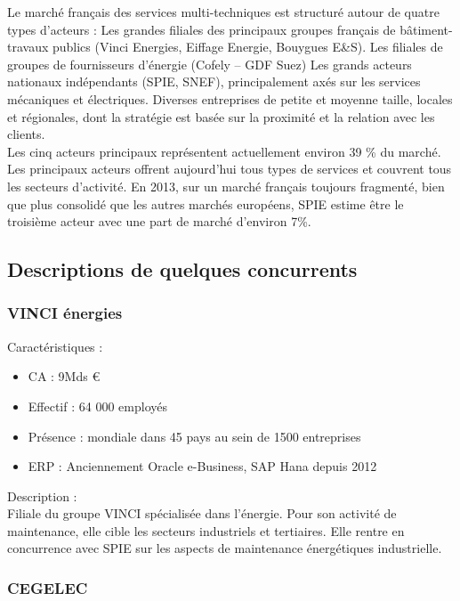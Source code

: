Le marché français des services multi-techniques est structuré autour de quatre types d’acteurs : 
Les grandes filiales des principaux groupes français de bâtiment-travaux publics (Vinci Energies, Eiffage Energie, Bouygues E\&S). 
Les filiales de groupes de fournisseurs d’énergie (Cofely – GDF Suez)
Les grands acteurs nationaux indépendants (SPIE, SNEF), principalement axés sur les services mécaniques et électriques.
Diverses entreprises de petite et moyenne taille, locales et régionales, dont la stratégie est basée sur la proximité et la relation avec les clients. \\

Les cinq acteurs principaux représentent actuellement environ 39 \% du marché. Les principaux acteurs offrent aujourd’hui tous types de services et couvrent tous les secteurs d’activité. En 2013, sur un marché français toujours fragmenté, bien que plus consolidé que les autres marchés européens, SPIE estime être le troisième acteur avec une part de marché d’environ 7\%.

\subsection{Descriptions de quelques concurrents}
 
\subsubsection{VINCI énergies}

Caractéristiques : \\

\begin{itemize}
    \item CA : 9Mds €
    \item Effectif : 64 000 employés
    \item Présence : mondiale dans 45 pays au sein de 1500 entreprises
    \item ERP : Anciennement Oracle e-Business, SAP Hana depuis 2012
\end{itemize}

Description : \\

Filiale du groupe VINCI spécialisée dans l’énergie. Pour son activité de maintenance, elle cible les secteurs industriels et tertiaires. Elle rentre en concurrence avec SPIE sur les aspects de maintenance énergétiques industrielle.

\subsubsection{CEGELEC}

